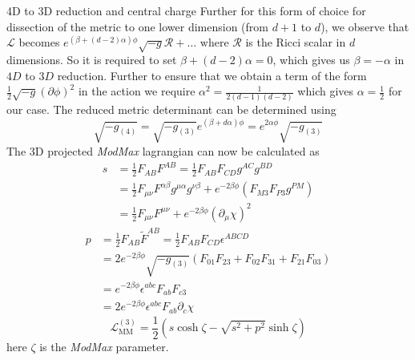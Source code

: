 \begin{frame}[allowframebreaks]{4D to 3D reduction and central charge \cite{Dharewa2024}}
Further for this form of choice for dissection of the metric to one lower dimension (from $d+1$ to $d$), we observe that $\mathcal{L}$ becomes $e^{(\beta+(d-2)\alpha)\phi}\sqrt{-g}\mathcal{R}+\hdots \text{ where } \mathcal{R}$ is the Ricci scalar in $d$ dimensions. So it is required to set $\beta+(d-2)\alpha=0$, which gives us $\beta=-\alpha$ in $4D$ to $3D$ reduction. Further to ensure that we obtain a term of the form $\frac{1}{2}\sqrt{-g}\left(\partial\phi\right)^2 $  in the action we require $\alpha^2 = \displaystyle\frac{1}{2(d-1)(d-2)}$ which gives $\alpha = \frac{1}{2}$ for our case. The reduced metric determinant can be determined using 
\begin{equation*}
    \sqrt{-g_{(4)}} = \sqrt{-g_{(3)}}e^{(\beta+d\alpha)\phi} = e^{2\alpha\phi}\sqrt{-g_{(3)}}
\end{equation*}
The 3D projected \textit{ModMax} lagrangian can now be calculated as
\begin{align*}
    s&=\frac{1}{2}F_{AB}F^{AB} = \frac{1}{2}F_{AB}F_{CD}g^{AC}g^{BD}\\ 
     &= \frac{1}{2}F_{\mu\nu}F^{\alpha\beta}g^{\mu\alpha}g^{\nu\beta} + e^{-2\beta\phi}\left(F_{M3}F_{P3}g^{PM}\right) \\ 
    &=\frac{1}{2}F_{\mu\nu}F^{\mu\nu} + e^{-2\beta\phi}(\partial_{\mu}\chi)^2
\end{align*}
\begin{align*}
    p&=\frac{1}{2}F_{AB}\tilde{F}^{AB} = \frac{1}{2}F_{AB}F_{CD}\epsilon^{ABCD} \\ 
    &= 2e^{-2\beta\phi}\sqrt{-g_{(3)}} \left ( F_{01}F_{23} + F_{02}F_{31} + F_{21}F_{03} \right ) \\ 
    &= e^{-2\beta\phi}\epsilon^{abc}F_{ab}F_{c3} \\ 
    &= 2e^{-2\beta\phi}\epsilon^{abc}F_{ab}\partial_{c}\chi
\end{align*}
\begin{equation}
    \mathcal{L}_{\text{MM}}^{(3)} = \frac{1}{2}\left(s\cosh\zeta - \sqrt{s^2 + p^2}\sinh\zeta\right)
\end{equation}
here $\zeta$ is the \textit{ModMax} parameter.


\end{frame}
